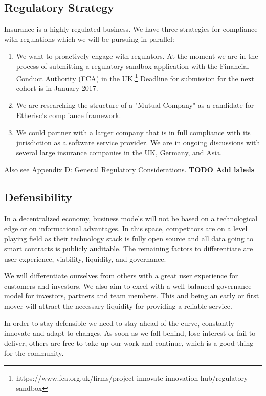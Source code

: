 \documentclass[12pt]{article}
\begin{document}
\subsection{Regulatory Strategy}

Insurance is a highly-regulated business. We have three strategies for compliance with regulations which we will be pursuing in parallel:

\begin{enumerate}
    \item We want to proactively engage with regulators. At the moment we are in the process of submitting a regulatory sandbox application with the Financial Conduct Authority (FCA) in the UK.\footnote{ https://www.fca.org.uk/firms/project-innovate-innovation-hub/regulatory-sandbox} Deadline for submission for the next cohort is in January 2017.
    \item We are researching the structure of a "Mutual Company" as a candidate for Etherisc's compliance framework.
    \item We could partner with a larger company that is in full compliance with its jurisdiction as a software service provider. We are in ongoing discussions with several large insurance companies in the UK, Germany, and Asia.
\end{enumerate}

Also see Appendix D: General Regulatory Considerations. \textbf{TODO Add labels}

\subsection{Defensibility}

In a decentralized economy, business models will not be based on a technological edge or on informational advantages. In this space, competitors are on a level playing field as their technology stack is fully open source and all data going to smart contracts is publicly auditable. The remaining factors to differentiate are user experience, viability, liquidity, and governance.

We will differentiate ourselves from others with a great user experience for customers and investors. We also aim to excel with a well balanced governance model for investors, partners and team members. This and being an early or first mover will attract the necessary liquidity for providing a reliable service.

In order to stay defensible we need to stay ahead of the curve, constantly innovate and adapt to changes. As soon as we fall behind, lose interest or fail to deliver, others are free to take up our work and continue, which is a good thing for the community.
\end{document}
